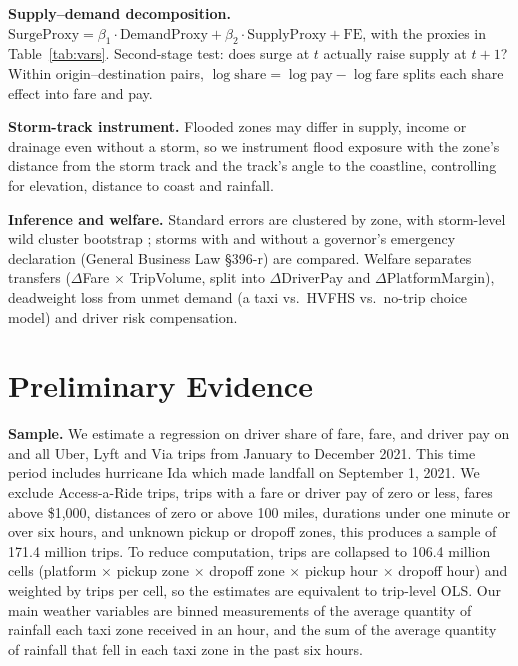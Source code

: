 \documentclass[11pt]{article}
\begin{document}
\textbf{Supply--demand decomposition.} $\text{SurgeProxy} = \beta_1 \cdot \text{DemandProxy} + \beta_2 \cdot \text{SupplyProxy} + \text{FE}$, with the proxies in Table~\ref{tab:vars}. Second-stage test: does surge at $t$ actually raise supply at $t+1$? Within origin--destination pairs, $\log \text{share} = \log \text{pay} - \log \text{fare}$ splits each share effect into fare and pay.

\textbf{Storm-track instrument.} Flooded zones may differ in supply, income or drainage even without a storm, so we instrument flood exposure with the zone's distance from the storm track and the track's angle to the coastline, controlling for elevation, distance to coast and rainfall.

\textbf{Inference and welfare.} Standard errors are clustered by zone, with storm-level wild cluster bootstrap \citep{cameron2008}; storms with and without a governor's emergency declaration (General Business Law \S396-r) are compared. Welfare separates transfers ($\Delta$Fare $\times$ TripVolume, split into $\Delta$DriverPay and $\Delta$PlatformMargin), deadweight loss from unmet demand (a taxi vs.\ HVFHS vs.\ no-trip choice model) and driver risk compensation.

\section{Preliminary Evidence}

\textbf{Sample.} We estimate a regression on driver share of fare, fare, and driver pay on and all Uber, Lyft and Via trips from January to December 2021. This time period includes hurricane Ida which made landfall on September 1, 2021. We exclude Access-a-Ride trips, trips with a fare or driver pay of zero or less, fares above \$1,000, distances of zero or above 100 miles, durations under one minute or over six hours, and unknown pickup or dropoff zones, this produces a sample of 171.4 million trips. To reduce computation, trips are collapsed to 106.4 million cells (platform $\times$ pickup zone $\times$ dropoff zone $\times$ pickup hour $\times$ dropoff hour) and weighted by trips per cell, so the estimates are equivalent to trip-level OLS. Our main weather variables are binned measurements of the average quantity of rainfall each taxi zone received in an hour, and the sum of the average quantity of rainfall that fell in each taxi zone in the past six hours. 
\end{document}
